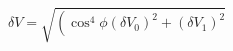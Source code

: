 \begin{equation}
\label{eq:delta_V_Malus}
\delta V = \sqrt{ \left(\cos^4{\phi}(\delta V_0)^2 + (\delta V_1)^2}
\end{equation}